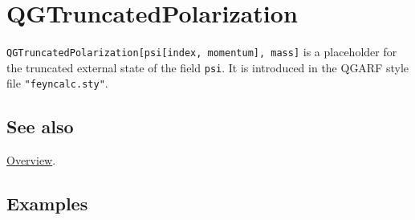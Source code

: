 \documentclass[../FeynHelpersManual.tex]{subfiles}
\begin{document}
\hypertarget{qgtruncatedpolarization}{
\section{QGTruncatedPolarization}\label{qgtruncatedpolarization}}

\texttt{QGTruncatedPolarization[\allowbreak{}psi[\allowbreak{}index,\ \allowbreak{}momentum],\ \allowbreak{}mass]}
is a placeholder for the truncated external state of the field
\texttt{psi}. It is introduced in the QGARF style file
\texttt{"feyncalc.sty"}.

\subsection{See also}

\hyperlink{toc}{Overview}.

\subsection{Examples}
\end{document}
